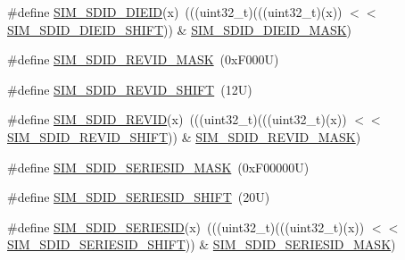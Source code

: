 \begin{DoxyCompactItemize}
\item 
\#define \mbox{\hyperlink{group___s_i_m___register___masks_gaea847889b6fc3ce04fbbe415d64ef070}{S\+I\+M\+\_\+\+S\+D\+I\+D\+\_\+\+D\+I\+E\+ID}}(x)~(((uint32\+\_\+t)(((uint32\+\_\+t)(x)) $<$$<$ \mbox{\hyperlink{group___s_i_m___register___masks_gaedeb2d58c67fcc1e588f224527ac623b}{S\+I\+M\+\_\+\+S\+D\+I\+D\+\_\+\+D\+I\+E\+I\+D\+\_\+\+S\+H\+I\+FT}})) \& \mbox{\hyperlink{group___s_i_m___register___masks_ga8b02a91f9dd18064e4fc83575cfb117e}{S\+I\+M\+\_\+\+S\+D\+I\+D\+\_\+\+D\+I\+E\+I\+D\+\_\+\+M\+A\+SK}})
\item 
\#define \mbox{\hyperlink{group___s_i_m___register___masks_gafefd91d0385c1b93049ec14409ed6b1e}{S\+I\+M\+\_\+\+S\+D\+I\+D\+\_\+\+R\+E\+V\+I\+D\+\_\+\+M\+A\+SK}}~(0x\+F000\+U)
\item 
\#define \mbox{\hyperlink{group___s_i_m___register___masks_gadb535428e0ca83d2494493ed04822b8c}{S\+I\+M\+\_\+\+S\+D\+I\+D\+\_\+\+R\+E\+V\+I\+D\+\_\+\+S\+H\+I\+FT}}~(12\+U)
\item 
\#define \mbox{\hyperlink{group___s_i_m___register___masks_gac72e070db07acc8b7964eb21ab91272f}{S\+I\+M\+\_\+\+S\+D\+I\+D\+\_\+\+R\+E\+V\+ID}}(x)~(((uint32\+\_\+t)(((uint32\+\_\+t)(x)) $<$$<$ \mbox{\hyperlink{group___s_i_m___register___masks_gadb535428e0ca83d2494493ed04822b8c}{S\+I\+M\+\_\+\+S\+D\+I\+D\+\_\+\+R\+E\+V\+I\+D\+\_\+\+S\+H\+I\+FT}})) \& \mbox{\hyperlink{group___s_i_m___register___masks_gafefd91d0385c1b93049ec14409ed6b1e}{S\+I\+M\+\_\+\+S\+D\+I\+D\+\_\+\+R\+E\+V\+I\+D\+\_\+\+M\+A\+SK}})
\item 
\#define \mbox{\hyperlink{group___s_i_m___register___masks_ga014f6aec38e92afbd07904db6ed617d0}{S\+I\+M\+\_\+\+S\+D\+I\+D\+\_\+\+S\+E\+R\+I\+E\+S\+I\+D\+\_\+\+M\+A\+SK}}~(0x\+F00000\+U)
\item 
\#define \mbox{\hyperlink{group___s_i_m___register___masks_ga47e31524526fda3e3058a55da89d098b}{S\+I\+M\+\_\+\+S\+D\+I\+D\+\_\+\+S\+E\+R\+I\+E\+S\+I\+D\+\_\+\+S\+H\+I\+FT}}~(20\+U)
\item 
\#define \mbox{\hyperlink{group___s_i_m___register___masks_gaef9ed54f0f9c0105ed9e07608e9a5f69}{S\+I\+M\+\_\+\+S\+D\+I\+D\+\_\+\+S\+E\+R\+I\+E\+S\+ID}}(x)~(((uint32\+\_\+t)(((uint32\+\_\+t)(x)) $<$$<$ \mbox{\hyperlink{group___s_i_m___register___masks_ga47e31524526fda3e3058a55da89d098b}{S\+I\+M\+\_\+\+S\+D\+I\+D\+\_\+\+S\+E\+R\+I\+E\+S\+I\+D\+\_\+\+S\+H\+I\+FT}})) \& \mbox{\hyperlink{group___s_i_m___register___masks_ga014f6aec38e92afbd07904db6ed617d0}{S\+I\+M\+\_\+\+S\+D\+I\+D\+\_\+\+S\+E\+R\+I\+E\+S\+I\+D\+\_\+\+M\+A\+SK}})
\item 
$$
\end{DoxyCompactItemize}
